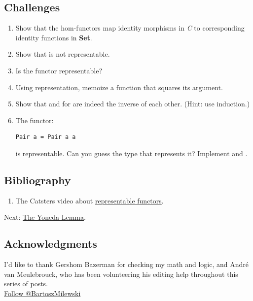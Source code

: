 \subsection{Challenges}\label{challenges}

\begin{enumerate}
\item
  Show that the hom-functors map identity morphisms in \emph{C} to
  corresponding identity functions in \textbf{Set}.
\item
  Show that  is not representable.
\item
  Is the  functor representable?
\item
  Using  representation, memoize a function that squares
  its argument.
\item
  Show that  and  for  are
  indeed the inverse of each other. (Hint: use induction.)
\item
  The functor:

\begin{verbatim}
Pair a = Pair a a
\end{verbatim}

  is representable. Can you guess the type that represents it? Implement
   and .
\end{enumerate}

\subsection{Bibliography}\label{bibliography}

\begin{enumerate}
\tightlist
\item
  The Catsters video about
  \href{https://www.youtube.com/watch?v=4QgjKUzyrhM}{representable
  functors}.
\end{enumerate}

Next:
\href{https://bartoszmilewski.com/2015/09/01/the-yoneda-lemma/}{The
Yoneda Lemma}.

\subsection{Acknowledgments}\label{acknowledgments}

I'd like to thank Gershom Bazerman for checking my math and logic, and
André van Meulebrouck, who has been volunteering his editing help
throughout this series of posts.\\
\href{https://twitter.com/BartoszMilewski}{Follow @BartoszMilewski}

